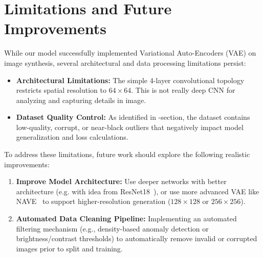 \documentclass[stu, 12pt, floatsintext]{apa7}
\begin{document}
\section{Limitations and Future Improvements}
While our model successfully implemented Variational Auto-Encoders (VAE) on image synthesis, several architectural and data processing limitations persist:

\begin{itemize}
	\item \textbf{Architectural Limitations:} The simple 4-layer convolutional topology restricts spatial resolution to $64\times64$.  This is not really deep CNN for analyzing and capturing details in image.
	\item \textbf{Dataset Quality Control:} As identified in -section, the dataset contains low-quality, corrupt, or near-black outliers that negatively impact model generalization and loss calculations.
\end{itemize}

To address these limitations, future work should explore the following realistic improvements:
\begin{enumerate}
	\item \textbf{Improve Model Architecture:} Use deeper networks with better architecture (e.g. with idea from  ResNet18~\parencite{resnet18}), or use more advanced VAE like NAVE~\parencite{nvae} to support  higher-resolution generation ($128\times128$ or $256\times256$).
	\item \textbf{Automated Data Cleaning Pipeline:} Implementing an automated filtering mechanism (e.g., density-based anomaly detection or brightness/contrast thresholds) to automatically remove invalid or corrupted images prior to split and training.
\end{enumerate}
\printbibliography %

%
\end{document}
